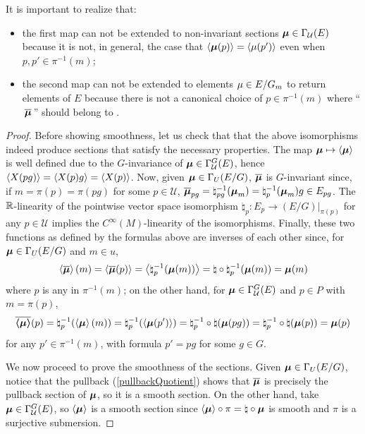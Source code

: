 It is important to realize that:
\begin{itemize}
    \item the first map can not be extended to non-invariant sections $\bm{\mu} \in \Gamma_{\mathcal U}(E)$ because it is not, in general, the case that $\left\langle \bm{\mu}(p) \right\rangle = \left\langle \mu(p') \right\rangle$ even when $p, p' \in \pi^{-1}(m)$;
    
    \item the second map can not be extended to elements $\mathfrak{\mu} \in E/G_m$ to return elements of $E$ because there is not a canonical choice of $p \in \pi^{-1}(m)$ where ``$\,\overline{\bm{\mathfrak{\mu}}}\,$'' should belong to .
\end{itemize}

\begin{proof}
Before showing smoothness, let us check that that the above isomorphisms indeed produce sections that satisfy the necessary properties.
The map $\bm{\mu} \mapsto \left\langle \bm{\mu} \right\rangle$ is well defined due to the $G$-invariance of $\bm{\mu} \in \Gamma^G_{\mathcal U}(E)$, hence $\left\langle X(pg) \right\rangle = \left\langle X(p)g \right\rangle = \left\langle X(p) \right\rangle$. 
Now, given $\bm{\mathfrak{\mu}} \in \Gamma_U(E/G)$, $\overline{\bm{\mathfrak{\mu}}}$ is $G$-invariant since, if $m = \pi(p) = \pi(pg)$ for some $p \in \mathcal U$, $\overline{\bm{\mathfrak{\mu}}}_{pg} = \natural^{-1}_{pg}(\bm{\mathfrak{\mu}}_{m}) = \natural^{-1}_{p}(\bm{\mathfrak{\mu}}_{m})g \in E_{pg}$. 
The $\mathbb{R}$-linearity of the pointwise vector space isomorphism $\natural_p:E_p \to (E/G)|_{\pi(p)}$ for any $p \in \mathcal U$ implies the $C^{\infty}(M)$-linearity of the isomorphisms.
Finally, these two functions as defined by the formulas above are inverses of each other since, 
for $\bm{\mathfrak{\mu}} \in \Gamma_U(E/G)$ and $m \in u$, 
\[\left\langle \overline{\bm{\mathfrak{\mu}}} \right\rangle(m) = \left\langle \overline{\bm{\mathfrak{\mu}}} (p) \right\rangle = \left\langle  \natural_p^{-1}(\bm{\mathfrak{\mu}}(m))  \right\rangle = \natural \circ \natural_p^{-1}(\bm{\mathfrak{\mu}}(m)) = \bm{\mathfrak{\mu}}(m)\] 
where $p$ is any in $\pi^{-1}(m)$; on the other hand,
for $\bm{\mu} \in \Gamma^G_{\mathcal U}(E)$ and $p \in P$ with $m = \pi(p)$, 
\[\overline{\bm{\left\langle \bm{\mu} \right\rangle}}(p) = \natural_p^{-1}(\left\langle \bm{\mu} \right\rangle(m)) = \natural_p^{-1}(\left\langle \bm{\mu}(p') \right\rangle) = \natural_p^{-1} \circ \natural (\bm{\mu}(pg)) = \natural_p^{-1} \circ \natural (\bm{\mu}(p)) = \bm{\mu}(p)\]
for any $p' \in \pi^{-1}(m)$, with formula $p' = pg$ for some $g\in G$.

We now proceed to prove the smoothness of the sections. Given $\bm{\mathfrak{\mu}} \in \Gamma_U(E/G)$, notice that the pullback (\ref{pullbackQuotient}) shows that $\overline{\bm{\mathfrak{\mu}}}$ is precisely the pullback section of $\bm{\mathfrak{\mu}}$, so it is a smooth section. On the other hand, take $\bm{\mu} \in \Gamma^G_{\mathcal U}(E)$, so $\left\langle \bm{\mu} \right\rangle$ is a smooth section since $\left\langle \bm{\mu} \right\rangle \circ \pi = \natural \circ \bm{\mu}$ is smooth and $\pi$ is a surjective submersion.

\end{proof}

